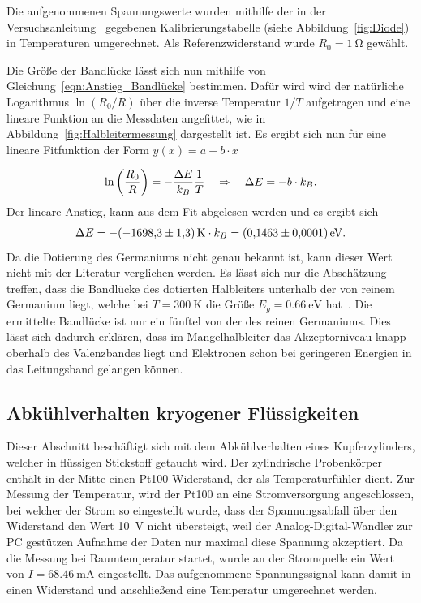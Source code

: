 \documentclass[parskip=half, a4paper,twoside,final]{article}
\begin{document}
Die aufgenommenen Spannungswerte wurden mithilfe der in der Versuchsanleitung~\cite{Thurk} gegebenen Kalibrierungstabelle (siehe Abbildung~\ref{fig:Diode}) in Temperaturen umgerechnet. Als Referenzwiderstand wurde $R_0 = \SI{1}{\ohm}$ gewählt.

Die Größe der Bandlücke lässt sich nun mithilfe von Gleichung~\eqref{eqn:Anstieg_Bandlücke} bestimmen. Dafür wird wird der natürliche Logarithmus $\ln(R_0/R)$ über die inverse Temperatur $1/T$ aufgetragen und eine lineare Funktion an die Messdaten angefittet, wie in Abbildung~\ref{fig:Halbleitermessung} dargestellt ist. Es ergibt sich nun für eine lineare Fitfunktion der Form $y(x) = a + b\cdot x$



\begin{align}
  \ln\qty(\frac{R_0}{R}) = - \frac{\Delta E}{k_B}\frac{1}{T} \quad \Rightarrow \quad \Delta E = - b \cdot k_B.
\end{align}
Der lineare Anstieg, kann aus dem Fit abgelesen werden und es ergibt sich
\begin{align}
  \Delta E = -\SI{-1698.3\pm 1.3}{\kelvin} \cdot k_B = \SI{0.1463\pm0.0001}{\electronvolt}.
\end{align}
Da die Dotierung des Germaniums nicht genau bekannt ist, kann dieser Wert nicht mit der Literatur verglichen werden. Es lässt sich nur die Abschätzung treffen, dass die Bandlücke des dotierten Halbleiters unterhalb der von reinem Germanium liegt, welche bei $T=\SI{300}{\kelvin}$ die Größe $E_g = \SI{0.66}{\electronvolt}$ hat~\cite{Hunklinger}. Die ermittelte Bandlücke ist nur ein fünftel von der des reinen Germaniums. Dies lässt sich dadurch erklären, dass im Mangelhalbleiter das Akzeptorniveau knapp oberhalb des Valenzbandes liegt und Elektronen schon bei geringeren Energien in das Leitungsband gelangen können.

\subsection{Abkühlverhalten kryogener Flüssigkeiten}

Dieser Abschnitt beschäftigt sich mit dem Abkühlverhalten eines Kupferzylinders, welcher in flüssigen Stickstoff getaucht wird. Der zylindrische Probenkörper enthält in der Mitte einen Pt100 Widerstand, der als Temperaturfühler dient. Zur Messung der Temperatur, wird der Pt100 an eine Stromversorgung angeschlossen, bei welcher der Strom so eingestellt wurde, dass der Spannungsabfall über den Widerstand den Wert \SI{10}{\volt} nicht übersteigt, weil der Analog-Digital-Wandler zur PC gestützen Aufnahme der Daten nur maximal diese Spannung akzeptiert. Da die Messung bei Raumtemperatur startet, wurde an der Stromquelle ein Wert von $I = \SI{68.46}{\milli\ampere}$ eingestellt. Das aufgenommene Spannungssignal kann damit in einen Widerstand und anschließend eine Temperatur umgerechnet werden.
\end{document}
